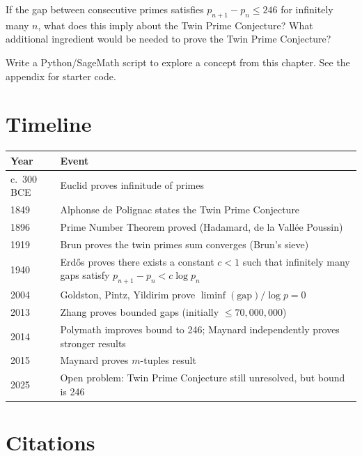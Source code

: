 \begin{exercise}
If the gap between consecutive primes satisfies $p_{n+1} - p_n \leq 246$ for infinitely many $n$, what does this imply about the Twin Prime Conjecture? What additional ingredient would be needed to prove the Twin Prime Conjecture?
\end{exercise}


\begin{exercise}[Computational]
Write a Python/SageMath script to explore a concept from this chapter. See the appendix for starter code.
\end{exercise}

\section{Timeline}

\begin{tabularx}{\linewidth}{lX}
\toprule
\textbf{Year} & \textbf{Event} \\ \midrule
c.\ 300 BCE & Euclid proves infinitude of primes \\ 
1849 & Alphonse de Polignac states the Twin Prime Conjecture \\ 
1896 & Prime Number Theorem proved (Hadamard, de la Vall\'ee Poussin) \\ 
1919 & Brun proves the twin primes sum converges (Brun's sieve) \cite{brun1919} \\ 
1940 & Erd\H{o}s proves there exists a constant $c < 1$ such that infinitely many gaps satisfy $p_{n+1} - p_n < c \log p_n$ \cite{erdos1940} \\ 
2004 & Goldston, Pintz, Yildirim prove $\liminf (\text{gap})/\log p = 0$ \cite{gpy2009} \\ 
2013 & Zhang proves bounded gaps (initially $\leq 70,000,000$) \cite{zhang2014} \\ 
2014 & Polymath improves bound to 246; Maynard independently proves stronger results \cite{polymath2014,maynard2015} \\ 
2015 & Maynard proves $m$-tuples result \cite{maynard2015} \\ 
2025 & Open problem: Twin Prime Conjecture still unresolved, but bound is 246 \\ \bottomrule
\end{tabularx}

\section{Citations}

